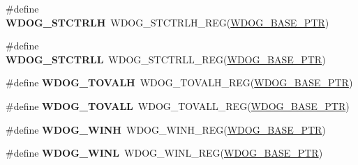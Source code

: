 \begin{DoxyCompactItemize}
\item 
\hypertarget{group___w_d_o_g___register___accessor___macros_ga682e2c5e771ae99e572597d5a9ee8620}{}\#define {\bfseries W\+D\+O\+G\+\_\+\+S\+T\+C\+T\+R\+L\+H}~W\+D\+O\+G\+\_\+\+S\+T\+C\+T\+R\+L\+H\+\_\+\+R\+E\+G(\hyperlink{group___w_d_o_g___peripheral_ga72fb27c7bc1ae124f180d8f2c7b9fa79}{W\+D\+O\+G\+\_\+\+B\+A\+S\+E\+\_\+\+P\+T\+R})\label{group___w_d_o_g___register___accessor___macros_ga682e2c5e771ae99e572597d5a9ee8620}

\item 
\hypertarget{group___w_d_o_g___register___accessor___macros_gabe98a0873c234c1297e69e1cfb7ebb9e}{}\#define {\bfseries W\+D\+O\+G\+\_\+\+S\+T\+C\+T\+R\+L\+L}~W\+D\+O\+G\+\_\+\+S\+T\+C\+T\+R\+L\+L\+\_\+\+R\+E\+G(\hyperlink{group___w_d_o_g___peripheral_ga72fb27c7bc1ae124f180d8f2c7b9fa79}{W\+D\+O\+G\+\_\+\+B\+A\+S\+E\+\_\+\+P\+T\+R})\label{group___w_d_o_g___register___accessor___macros_gabe98a0873c234c1297e69e1cfb7ebb9e}

\item 
\hypertarget{group___w_d_o_g___register___accessor___macros_ga64a1039724acdbacf39352885a760505}{}\#define {\bfseries W\+D\+O\+G\+\_\+\+T\+O\+V\+A\+L\+H}~W\+D\+O\+G\+\_\+\+T\+O\+V\+A\+L\+H\+\_\+\+R\+E\+G(\hyperlink{group___w_d_o_g___peripheral_ga72fb27c7bc1ae124f180d8f2c7b9fa79}{W\+D\+O\+G\+\_\+\+B\+A\+S\+E\+\_\+\+P\+T\+R})\label{group___w_d_o_g___register___accessor___macros_ga64a1039724acdbacf39352885a760505}

\item 
\hypertarget{group___w_d_o_g___register___accessor___macros_ga1ed33751ec9e2b0d17178c1acaf264b7}{}\#define {\bfseries W\+D\+O\+G\+\_\+\+T\+O\+V\+A\+L\+L}~W\+D\+O\+G\+\_\+\+T\+O\+V\+A\+L\+L\+\_\+\+R\+E\+G(\hyperlink{group___w_d_o_g___peripheral_ga72fb27c7bc1ae124f180d8f2c7b9fa79}{W\+D\+O\+G\+\_\+\+B\+A\+S\+E\+\_\+\+P\+T\+R})\label{group___w_d_o_g___register___accessor___macros_ga1ed33751ec9e2b0d17178c1acaf264b7}

\item 
\hypertarget{group___w_d_o_g___register___accessor___macros_gafba071ed7ec77bbc7c4a8523902d73b1}{}\#define {\bfseries W\+D\+O\+G\+\_\+\+W\+I\+N\+H}~W\+D\+O\+G\+\_\+\+W\+I\+N\+H\+\_\+\+R\+E\+G(\hyperlink{group___w_d_o_g___peripheral_ga72fb27c7bc1ae124f180d8f2c7b9fa79}{W\+D\+O\+G\+\_\+\+B\+A\+S\+E\+\_\+\+P\+T\+R})\label{group___w_d_o_g___register___accessor___macros_gafba071ed7ec77bbc7c4a8523902d73b1}

\item 
\hypertarget{group___w_d_o_g___register___accessor___macros_gafcfff3b1d3ea71447881afd8b633b29c}{}\#define {\bfseries W\+D\+O\+G\+\_\+\+W\+I\+N\+L}~W\+D\+O\+G\+\_\+\+W\+I\+N\+L\+\_\+\+R\+E\+G(\hyperlink{group___w_d_o_g___peripheral_ga72fb27c7bc1ae124f180d8f2c7b9fa79}{W\+D\+O\+G\+\_\+\+B\+A\+S\+E\+\_\+\+P\+T\+R})\label{group___w_d_o_g___register___accessor___macros_gafcfff3b1d3ea71447881afd8b633b29c}


\end{DoxyCompactItemize}
